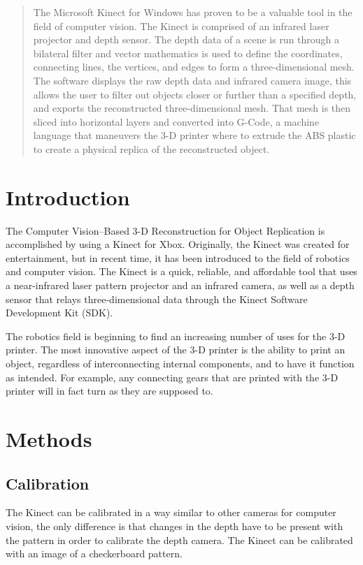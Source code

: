 \documentclass[pdftex,10.5pt]{report}
\begin{document}


\begin{abstract}
The Microsoft Kinect for Windows has proven to be a valuable tool in the field of computer vision. The Kinect is comprised of an infrared laser projector and depth sensor. The depth data of a scene is run through a bilateral filter and vector mathematics is used to define the coordinates, connecting lines, the vertices, and edges to form a three-dimensional mesh. The software displays the raw depth data and infrared camera image, this allows the user to filter out objects closer or further than a specified depth, and exports the reconstructed three-dimensional mesh. That mesh is then sliced into horizontal layers and converted into G-Code, a machine language that maneuvers the 3-D printer where to extrude the ABS plastic to create a physical replica of the reconstructed object. 
\end{abstract}

\tableofcontents

\section{Introduction}
The Computer Vision--Based 3-D Reconstruction for Object Replication is accomplished by using a Kinect for Xbox. Originally, the Kinect was created for entertainment, but in recent time, it has been introduced to the field of robotics and computer vision. The Kinect is a quick, reliable, and affordable tool that uses a near-infrared laser pattern projector and an infrared camera, as well as a depth sensor that relays three-dimensional data through the Kinect Software Development Kit (SDK).

The robotics field is beginning to find an increasing number of uses for the 3-D printer. The most innovative aspect of the 3-D printer is the ability to print an object, regardless of interconnecting internal components, and to have it function as intended. For example, any connecting gears that are printed with the 3-D printer will in fact turn as they are supposed to.

\section{Methods}
\subsection{Calibration}
The Kinect can be calibrated in a way similar to other cameras for computer vision, the only difference is that changes in the depth have to be present  with the pattern in order to calibrate the depth camera. The Kinect can be calibrated with an image of a checkerboard pattern.
\end{document}
